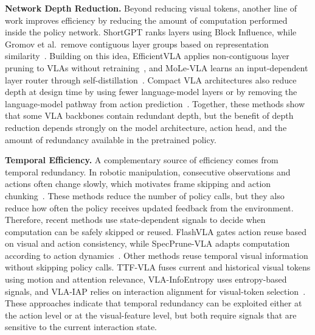 \noindent\textbf{Network Depth Reduction.}
Beyond reducing visual tokens, another line of work improves efficiency by reducing the amount of computation performed inside the policy network. ShortGPT ranks layers using Block Influence, while Gromov et al.\ remove contiguous layer groups based on representation similarity~\cite{shortgpt,gromov}. Building on this idea, EfficientVLA applies non-contiguous layer pruning to VLAs without retraining~\cite{efficientvla}, and MoLe-VLA learns an input-dependent layer router through self-distillation~\cite{molevla}. Compact VLA architectures also reduce depth at design time by using fewer language-model layers or by removing the language-model pathway from action prediction~\cite{flower,smolvla,turbovla}. Together, these methods show that some VLA backbones contain redundant depth, but the benefit of depth reduction depends strongly on the model architecture, action head, and the amount of redundancy available in the pretrained policy.

\noindent\textbf{Temporal Efficiency.}
A complementary source of efficiency comes from temporal redundancy. In robotic manipulation, consecutive observations and actions often change slowly, which motivates frame skipping and action chunking~\cite{dqn,act,diffusionpolicy,openvlaoft}. These methods reduce the number of policy calls, but they also reduce how often the policy receives updated feedback from the environment. Therefore, recent methods use state-dependent signals to decide when computation can be safely skipped or reused. FlashVLA gates action reuse based on visual and action consistency, while SpecPrune-VLA adapts computation according to action dynamics~\cite{flashvla,specprune}. Other methods reuse temporal visual information without skipping policy calls. TTF-VLA fuses current and historical visual tokens using motion and attention relevance, VLA-InfoEntropy uses entropy-based signals, and VLA-IAP relies on interaction alignment for visual-token selection~\cite{ttfvla,vlainfoentropy,vlaiap}. These approaches indicate that temporal redundancy can be exploited either at the action level or at the visual-feature level, but both require signals that are sensitive to the current interaction state.

